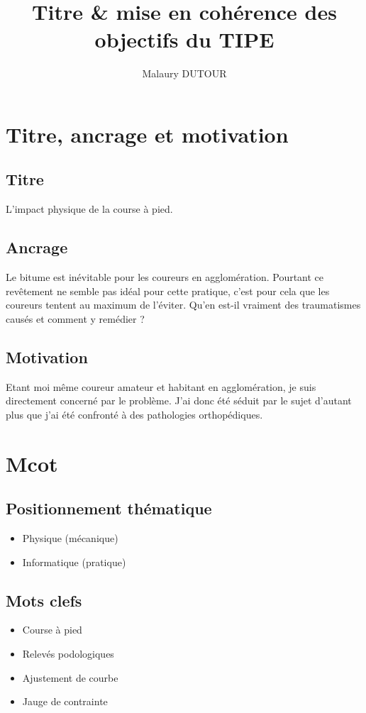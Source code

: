 \documentclass[11pt]{article}
\author{Malaury DUTOUR}
\date{}
\title{Titre \& mise en cohérence des objectifs du TIPE}
\begin{document}
\maketitle

\section{Titre, ancrage et motivation}
\label{sec:orgb252f73}
\subsection{Titre}
\label{sec:org5a6a496}
L'impact physique de la course à pied.\\\empty
\subsection{Ancrage}
\label{sec:org6744148}
Le bitume est inévitable pour les coureurs en agglomération. Pourtant ce revêtement ne semble pas idéal pour cette pratique, c'est pour cela que les coureurs tentent au maximum de l'éviter. Qu'en est-il vraiment des traumatismes causés et comment y remédier ?\\\empty
\subsection{Motivation}
\label{sec:org26ebf90}
Etant moi même coureur amateur et habitant en agglomération, je suis directement concerné par le problème. J'ai donc été séduit par le sujet d'autant plus que j'ai été confronté à des pathologies orthopédiques.\\\empty
\section{Mcot}
\label{sec:org06ee91e}
\subsection{Positionnement thématique}
\label{sec:org38aa1c2}
\begin{itemize}
\item Physique (mécanique)\\\empty
\item Informatique (pratique)\\\empty
\end{itemize}
\subsection{Mots clefs}
\label{sec:org7493846}
\begin{itemize}
\item Course à pied\\\empty
\item Relevés podologiques\\\empty
\item Ajustement de courbe\\\empty
\item Jauge de contrainte\\\empty
\end{itemize}
\end{document}
